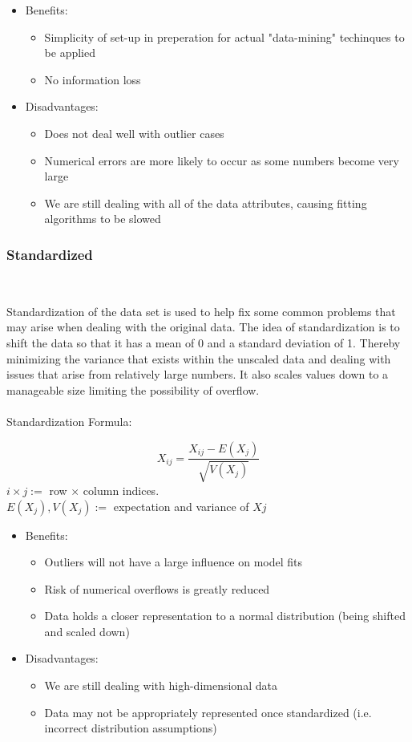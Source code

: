 \documentclass{article}
\begin{document}
		\begin{itemize}
			\item 	Benefits: 
			\begin{itemize}
				\item Simplicity of set-up in preperation for actual "data-mining" techinques to be applied
				\item No information loss
			\end{itemize}
			\item  	Disadvantages: 
			\begin{itemize}
				\item Does not deal well with outlier cases
				\item Numerical errors are more likely to occur as some numbers become very large
				\item We are still dealing with all of the data attributes, causing fitting algorithms to be slowed
			\end{itemize}
		\end{itemize}
		
		\subsubsection{Standardized}~
		
		Standardization of the data set is used to help fix some common problems that may arise when dealing with the original data. The idea of standardization is to shift the data so that it has a mean of 0 and a standard deviation of 1. Thereby minimizing the variance that exists within the unscaled data and dealing with issues that arise from relatively large numbers. It also scales values down to a manageable size limiting the possibility of overflow.\\\\
		Standardization Formula: 
		
		\begin{equation}
		 X_{ij} = \dfrac{X_{ij}- E(X_j)}{\sqrt{V(X_j)}}
		\end{equation}
		 $ i \times j := $ row $ \times $ column indices.\\ $ E(X_j),V(X_j) := $ expectation and variance of $ Xj $
		\begin{itemize}
			\item 	Benefits: 
			\begin{itemize}
				\item Outliers will not have a large influence on model fits
				\item Risk of numerical overflows is greatly reduced
				\item Data holds a closer representation to a normal distribution (being shifted and scaled down)
			\end{itemize}
			\item  	Disadvantages: 
			\begin{itemize}
				\item We are still dealing with high-dimensional data
				\item Data may not be appropriately represented once standardized (i.e. incorrect distribution assumptions)
			\end{itemize}
		\end{itemize}
			
\end{document}
